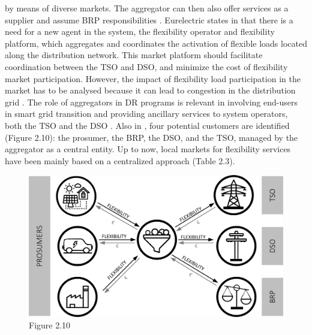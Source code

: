 by means of diverse markets. The aggregator can then also offer services as a supplier and assume BRP responsibilities \cite{MarketDesignENTSOE}. Eurelectric states in \cite{mandatova2014flexibility} that there is a need for a new agent in the system, the flexibility operator and flexibility platform, which aggregates and coordinates the activation of flexible loads located along the distribution network. This market platform should facilitate coordination between the TSO and DSO, and minimize the cost of flexibility market participation. However, the impact of flexibility load participation in the market has to be analysed because it can lead to congestion in the distribution grid \cite{esterl2016impact}. The role of aggregators in DR programs is relevant in involving end-users in smart grid transition and providing ancillary services to system operators, both the TSO and the DSO \cite{Carreiro2017}.
Also in \cite{USEFFoundation2015a}, four potential customers are identified (Figure 2.10): the prosumer, the BRP, the DSO, and the TSO, managed by the aggregator as a central entity. Up to now, local markets for flexibility services have been mainly based on a centralized approach (Table 2.3).

\begin{figure}[]
	\centering
	\includegraphics[width=0.4\columnwidth ]{ChapterIntro/Figures/Figure2.10.jpg}
		\caption{Figure 2.10}  
\label{figure210}
\end{figure}

